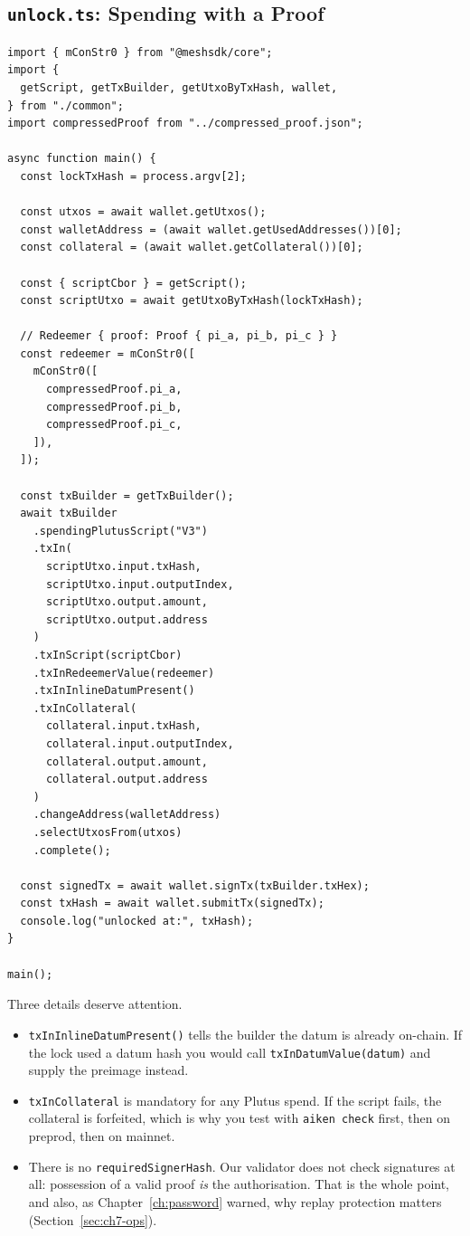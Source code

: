 \subsection*{\texttt{unlock.ts}: Spending with a Proof}

\begin{verbatim}
import { mConStr0 } from "@meshsdk/core";
import {
  getScript, getTxBuilder, getUtxoByTxHash, wallet,
} from "./common";
import compressedProof from "../compressed_proof.json";

async function main() {
  const lockTxHash = process.argv[2];

  const utxos = await wallet.getUtxos();
  const walletAddress = (await wallet.getUsedAddresses())[0];
  const collateral = (await wallet.getCollateral())[0];

  const { scriptCbor } = getScript();
  const scriptUtxo = await getUtxoByTxHash(lockTxHash);

  // Redeemer { proof: Proof { pi_a, pi_b, pi_c } }
  const redeemer = mConStr0([
    mConStr0([
      compressedProof.pi_a,
      compressedProof.pi_b,
      compressedProof.pi_c,
    ]),
  ]);

  const txBuilder = getTxBuilder();
  await txBuilder
    .spendingPlutusScript("V3")
    .txIn(
      scriptUtxo.input.txHash,
      scriptUtxo.input.outputIndex,
      scriptUtxo.output.amount,
      scriptUtxo.output.address
    )
    .txInScript(scriptCbor)
    .txInRedeemerValue(redeemer)
    .txInInlineDatumPresent()
    .txInCollateral(
      collateral.input.txHash,
      collateral.input.outputIndex,
      collateral.output.amount,
      collateral.output.address
    )
    .changeAddress(walletAddress)
    .selectUtxosFrom(utxos)
    .complete();

  const signedTx = await wallet.signTx(txBuilder.txHex);
  const txHash = await wallet.submitTx(signedTx);
  console.log("unlocked at:", txHash);
}

main();
\end{verbatim}

Three details deserve attention.

\begin{itemize}
  \item \texttt{txInInlineDatumPresent()} tells the builder the datum is already
        on-chain. If the lock used a datum hash you would call
        \texttt{txInDatumValue(datum)} and supply the preimage instead.
  \item \texttt{txInCollateral} is mandatory for any Plutus spend. If the script
        fails, the collateral is forfeited, which is why you test with
        \texttt{aiken check} first, then on preprod, then on mainnet.
  \item There is no \texttt{requiredSignerHash}. Our validator does not check
        signatures at all: possession of a valid proof \emph{is} the
        authorisation. That is the whole point, and also, as
        Chapter~\ref{ch:password} warned, why replay protection matters
        (Section~\ref{sec:ch7-ops}).
\end{itemize}

